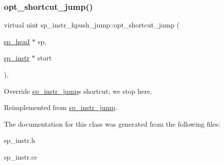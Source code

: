 \mbox{\label{classsp__instr__hpush__jump_a7b00002d8497221812af5f222a2a1732}} 
\subsubsection{\texorpdfstring{opt\+\_\+shortcut\+\_\+jump()}{opt\_shortcut\_jump()}}
{\footnotesize\ttfamily virtual uint sp\+\_\+instr\+\_\+hpush\+\_\+jump\+::opt\+\_\+shortcut\+\_\+jump (\begin{DoxyParamCaption}\item[{\mbox{\hyperlink{classsp__head}{sp\+\_\+head}} $\ast$}]{sp,  }\item[{\mbox{\hyperlink{classsp__instr}{sp\+\_\+instr}} $\ast$}]{start }\end{DoxyParamCaption})\hspace{0.3cm}{\ttfamily [inline]}, {\ttfamily [virtual]}}

Override \mbox{\hyperlink{classsp__instr__jump}{sp\+\_\+instr\+\_\+jump}}\textquotesingle{}s shortcut; we stop here. 

Reimplemented from \mbox{\hyperlink{classsp__instr__jump_a7c0f595bd9f39e9b38cc1e06333c3db0}{sp\+\_\+instr\+\_\+jump}}.



The documentation for this class was generated from the following files\+:\begin{DoxyCompactItemize}
\item 
sp\+\_\+instr.\+h\item 
sp\+\_\+instr.\+cc\end{DoxyCompactItemize}
